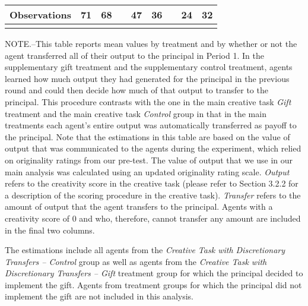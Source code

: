 \begin{table}[h]
\begin{center}
{\begin{tabular}{lcccccccc}
Observations &   71 &   68 && \hspace{15pt}   47 &   36 && \hspace{15pt}   24 &   32 \\
\hline\noalign{\medskip}
\end{tabular}}
\begin{minipage}{\textwidth} \setlength{\parindent}{15pt}
\footnotesize NOTE.--This table reports mean values by treatment and by whether or not the agent transferred all of their output to the principal in Period 1. 
In the supplementary gift treatment and the supplementary control treatment, agents learned how much output they had generated for the principal in the previous round and could then decide how much of that output to transfer to the principal. This procedure contrasts with the one in the main creative task \textit{Gift} treatment and the main creative task \textit{Control} group in that in the main treatments each agent's entire output was automatically transferred as payoff to the principal. Note that the estimations in this table are based on the value of output that was communicated to the agents during the experiment, which relied on originality ratings from our pre-test. 
The value of output that we use in our main analysis was calculated using an updated originality rating scale. \textit{Output} refers to the creativity score in the creative task (please refer to Section 3.2.2 for a description of the scoring procedure in the creative task). \textit{Transfer} refers to the amount of output that the agent transfers to the principal. 
Agents with a creativity score of 0 and who, therefore, cannot transfer any amount are included in the final two columns. 

The estimations include all agents from the \textit{Creative Task with Discretionary Transfers -- Control} group as well as agents from the \textit{Creative Task with Discretionary Transfers -- Gift} treatment group for which the principal decided to implement the gift. Agents from treatment groups for which the principal did not implement the gift are not included in this analysis.  
\end{minipage}
\end{center}
\end{table}
